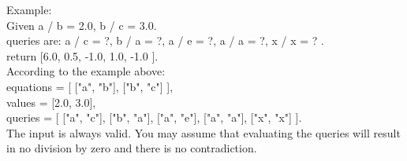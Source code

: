 Example:\\
Given a / b = 2.0, b / c = 3.0.\\
queries are: a / c = ?, b / a = ?, a / e = ?, a / a = ?, x / x = ? .\\
return [6.0, 0.5, -1.0, 1.0, -1.0 ].\\

According to the example above:\\
equations = [ ["a", "b"], ["b", "c"] ],\\
values = [2.0, 3.0],\\
queries = [ ["a", "c"], ["b", "a"], ["a", "e"], ["a", "a"], ["x", "x"] ]. \\

The input is always valid. You may assume that evaluating the queries will result in no division by zero and there is no contradiction. \\


